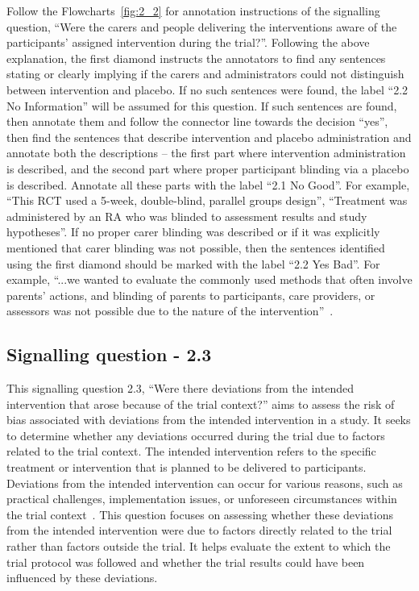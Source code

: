 \documentclass[sn-mathphys,Numbered]{sn-jnl}%
\begin{document}
Follow the Flowcharts~\ref{fig:2_2} for annotation instructions of the signalling question, ``Were the carers and people delivering the interventions aware of the participants' assigned intervention during the trial?''.
Following the above explanation, the first diamond instructs the annotators to find any sentences stating or clearly implying if the carers and administrators could not distinguish between intervention and placebo.
If no such sentences were found, the label ``2.2 No Information'' will be assumed for this question.
If such sentences are found, then annotate them and follow the connector line towards the decision ``yes'', then find the sentences that describe intervention and placebo administration and annotate both the descriptions – the first part where intervention administration is described, and the second part where proper participant blinding via a placebo is described.
Annotate all these parts with the label ``2.1 No Good''.
For example, ``This RCT used a 5-week, double-blind, parallel groups design'', ``Treatment was administered by an RA who was blinded to assessment results and study hypotheses''\cite{chiaravalloti2020efficacy}.
If no proper carer blinding was described or if it was explicitly mentioned that carer blinding was not possible, then the sentences identified using the first diamond should be marked with the label ``2.2 Yes Bad''.
For example, ``...we wanted to evaluate the commonly used methods that often involve parents’ actions, and blinding of parents to participants, care providers, or assessors was not possible due to the nature of the intervention''~\cite{andersson2020effect}.



%
%
%
\subsection*{Signalling question - 2.3}
\label{subsec:2_3}
%
This signalling question 2.3, ``Were there deviations from the intended intervention that arose because of the trial context?'' aims to assess the risk of bias associated with deviations from the intended intervention in a study.
It seeks to determine whether any deviations occurred during the trial due to factors related to the trial context.
The intended intervention refers to the specific treatment or intervention that is planned to be delivered to participants.
Deviations from the intended intervention can occur for various reasons, such as practical challenges, implementation issues, or unforeseen circumstances within the trial context~\cite{paterson2019feasibility}.
This question focuses on assessing whether these deviations from the intended intervention were due to factors directly related to the trial rather than factors outside the trial.
It helps evaluate the extent to which the trial protocol was followed and whether the trial results could have been influenced by these deviations.
\end{document}
